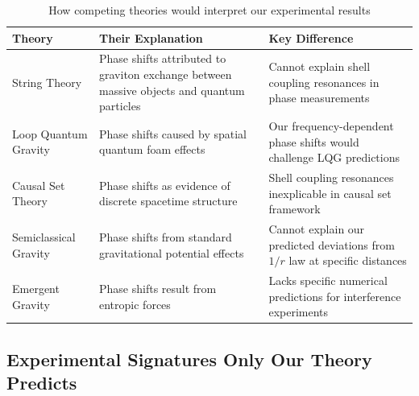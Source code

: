 \documentclass[12pt,a4paper]{article}
\begin{document}
\begin{table}[h]
\centering
\scriptsize
\setlength{\tabcolsep}{3pt}
\renewcommand{\arraystretch}{1.4}
\begin{tabular}{|p{}|p{}|p{}|}
\hline
\textbf{Theory} & \textbf{Their Explanation} & \textbf{Key Difference} \\
\hline
String Theory & Phase shifts attributed to graviton exchange between massive objects and quantum particles & Cannot explain shell coupling resonances in phase measurements \\
\hline
Loop Quantum Gravity & Phase shifts caused by spatial quantum foam effects & Our frequency-dependent phase shifts would challenge LQG predictions \\
\hline
Causal Set Theory & Phase shifts as evidence of discrete spacetime structure & Shell coupling resonances inexplicable in causal set framework \\
\hline
Semiclassical Gravity & Phase shifts from standard gravitational potential effects & Cannot explain our predicted deviations from $1/r$ law at specific distances \\
\hline
Emergent Gravity & Phase shifts result from entropic forces & Lacks specific numerical predictions for interference experiments \\
\hline
\end{tabular}
\caption{How competing theories would interpret our experimental results}
\label{tab:interpretations}
\end{table}

\subsection{Experimental Signatures Only Our Theory Predicts}
\end{document}
